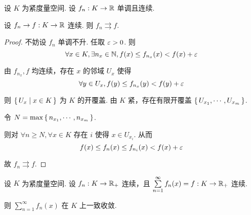\begin{property}[Dini]
    设 $K$ 为紧度量空间. 设 $f_n:K\to\mathbb{R}$ 单调且连续.
    
    设 $f_n\to f:K\to\mathbb{R}$ 连续. 则 $f_n\rightrightarrows f$.
\end{property}
\begin{proof}
    不妨设 $f_n$ 单调不升. 任取 $\varepsilon>0$. 则
$$
\forall x\in K,\exists n_x\in\mathbb{N},f(x)\le f_{n_x}(x)<f(x)+\varepsilon
$$

    由 $f_{n_x},f$ 均连续，存在 $x$ 的邻域 $U_x$ 使得
$$
\forall y\in U_x,f(y)\le f_{n_x}(y)<f(y)+\varepsilon
$$

    则 $\set{U_x|x\in K}$ 为 $K$ 的开覆盖. 由 $K$ 紧，存在有限开覆盖 $\set{U_{x_1},\cdots,U_{x_m}}$.

    令 $N=\max\set{n_{x_1},\cdots,n_{x_m}}$.

    则对 $\forall n\ge N,\forall x\in K$ 存在 $i$ 使得 $x\in U_{x_i}$. 从而
$$
f(x)\le f_n(x)\le f_{n_i}(x)<f(x)+\varepsilon
$$ 

    故 $f_n\rightrightarrows f$.
\end{proof}

\begin{inference}
    设 $K$ 为紧度量空间. 设 $f_n:K\to\mathbb{R}_+$ 连续，且 $\sum\limits_{n=1}^\infty f_n(x)=f:K\to\mathbb{R}_+$ 连续.

    则 $\sum\limits_{n=1}^\infty f_n(x)$ 在 $K$ 上一致收敛.
\end{inference}

